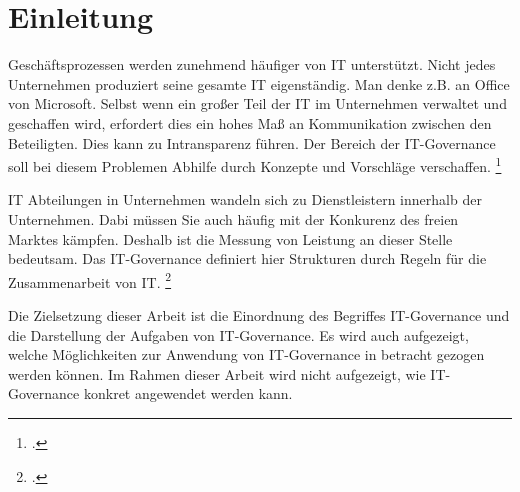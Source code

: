 \section{Einleitung}
Geschäftsprozessen werden zunehmend häufiger von \gls{IT} unterstützt. Nicht jedes Unternehmen produziert seine gesamte IT eigenständig. Man denke z.B. an Office von Microsoft. Selbst wenn ein großer Teil der IT im Unternehmen verwaltet und geschaffen wird, erfordert dies ein hohes Maß an Kommunikation zwischen den Beteiligten. Dies kann zu Intransparenz führen. Der Bereich der IT-Governance soll bei diesem Problemen Abhilfe durch Konzepte und Vorschläge verschaffen. \footcite[Vgl.][445]{meyer_it-governance_2003}

IT Abteilungen in Unternehmen wandeln sich zu Dienstleistern innerhalb der Unternehmen. Dabi müssen Sie auch häufig mit der Konkurenz des freien Marktes kämpfen. Deshalb ist die Messung von Leistung an dieser Stelle bedeutsam. Das IT-Governance definiert hier Strukturen durch Regeln für die Zusammenarbeit von IT. \footcite[Vgl.][446\psq]{meyer_it-governance_2003}

Die Zielsetzung dieser Arbeit ist die Einordnung des Begriffes IT-Governance und die Darstellung der Aufgaben von IT-Governance. 
Es wird auch aufgezeigt, welche Möglichkeiten zur Anwendung von IT-Governance in betracht gezogen werden können.
Im Rahmen dieser Arbeit wird nicht aufgezeigt, wie IT-Governance konkret angewendet werden kann. 

